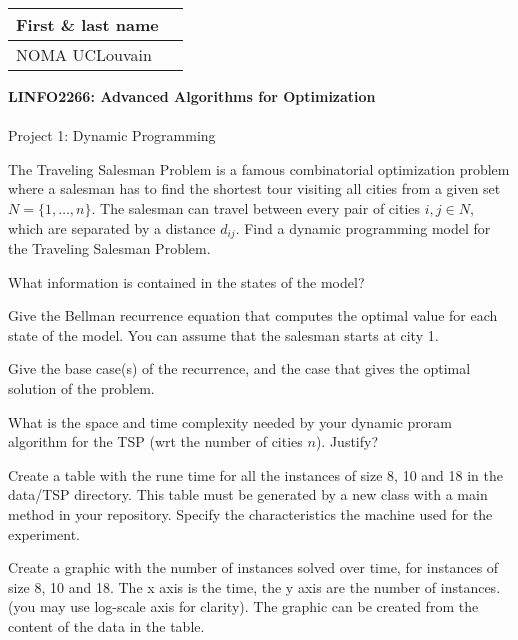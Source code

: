 \documentclass[12pt]{report}
\newcommand{\answerbox}[2]{\hfill\break\\
        \framebox[\linewidth]{\parbox[c][#1][c]{\dimexpr\linewidth-2\fboxsep-2\fboxrule}{#2}}
}
\begin{document}
\hfill
\begingroup
\Large
\begin{tabular}{|l|p{6cm}|}
	\hline
	First \& last name &
	\\ \hline
	NOMA UCLouvain & 
	\\ \hline
\end{tabular}
\endgroup
\vspace{1.5cm}

\noindent
\begingroup
	\Large
	\textbf{LINFO2266: Advanced Algorithms for Optimization}\\\\
	Project 1: Dynamic Programming
\endgroup
\vspace{0.2cm}

\begin{Exercise}[title={Modeling the Traveling Salesman Problem}]

The Traveling Salesman Problem is a famous combinatorial optimization problem where a salesman has to find the shortest tour visiting all cities from a given set $N=\{1,\ldots,n\}$.
The salesman can travel between every pair of cities $i,j \in N$, which are separated by a distance $d_{ij}$.
Find a dynamic programming model for the Traveling Salesman Problem.

\Question What information is contained in the states of the model?
\answerbox{1cm}{
}

\Question Give the Bellman recurrence equation that computes the optimal value for each state of the model. You can assume that the salesman starts at city 1.
\answerbox{1cm}{
}

\Question Give the base case(s) of the recurrence, and the case that gives the optimal solution of the problem.
\answerbox{1cm}{
}

\Question What is the space and time complexity needed by your dynamic proram algorithm for the TSP (wrt the number of cities $n$). Justify?
\answerbox{5cm}{
}



\end{Exercise}

\pagebreak

\begin{Exercise}[title={Experiments}]

\Question Create a table with the rune time for all the instances of size 8, 10 and 18 in the data/TSP directory. 
          This table must be generated by a new class with a main method in your repository.
	  Specify the characteristics the machine used for the experiment.
\answerbox{8cm}{
}

\Question Create a graphic with the number of instances solved over time, for instances of size 8, 10 and 18.
	  The x axis is the time, the y axis are the number of instances. (you may use log-scale axis for clarity).
	  The graphic can be created from the content of the data in the table.
\answerbox{8cm}{
}


\end{Exercise}
\end{document}
